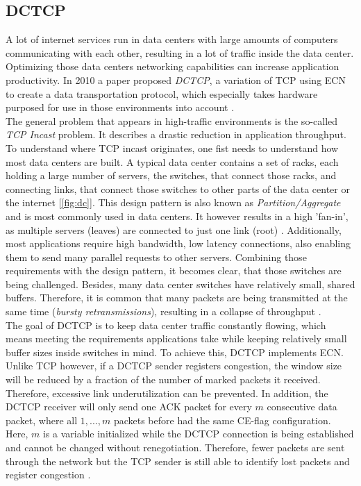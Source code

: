 \documentclass[a4paper,conference]{IEEEtran}
\begin{document}
\subsection{DCTCP}
\label{sec:DCTCP}
A lot of internet services run in data centers with large amounts of computers communicating with each other, resulting in a lot of traffic inside the data center. Optimizing those data centers networking capabilities can increase application productivity. In 2010 a paper proposed \textit{DCTCP}, a variation of TCP using ECN to create a data transportation protocol, which especially takes hardware purposed for use in those environments into account \cite{10.1145/1851275.1851192}.\\
The general problem that appears in high-traffic environments is the so-called \textit{TCP Incast} problem. It describes a drastic reduction in application throughput. To understand where TCP incast originates, one fist needs to understand how most data centers are built. A typical data center contains a set of racks, each holding a large number of servers, the switches, that connect those racks, and connecting links, that connect those switches to other parts of the data center or the internet [\autoref{fig:dc}]. This design pattern is also known as \textit{Partition/Aggregate} and is most commonly used in data centers. It however results in a high 'fan-in', as multiple servers (leaves) are connected to just one link (root) \cite{10.1145/1851275.1851192,10.1145/1592681.1592693}. Additionally, most applications require high bandwidth, low latency connections, also enabling them to send many parallel requests to other servers. Combining those requirements with the design pattern, it becomes clear, that those switches are being challenged. Besides, many data center switches have relatively small, shared buffers. Therefore, it is common that many packets are being transmitted at the same time (\textit{bursty retransmissions}), resulting in a collapse of throughput \cite{10.1145/1851275.1851192,10.1145/1592681.1592693}.\\
The goal of DCTCP is to keep data center traffic constantly flowing, which means meeting the requirements applications take while keeping relatively small buffer sizes inside switches in mind. To achieve this, DCTCP implements ECN. Unlike TCP however, if a DCTCP sender registers congestion, the window size will be reduced by a fraction of the number of marked packets it received. Therefore, excessive link underutilization can be prevented. In addition, the DCTCP receiver will only send one ACK packet for every $m$ consecutive data packet, where all $1,...,m$ packets before had the same CE-flag configuration. Here, $m$ is a variable initialized while the DCTCP connection is being established and cannot be changed without renegotiation. Therefore, fewer packets are sent through the network but the TCP sender is still able to identify lost packets and register congestion \cite{10.1145/1851275.1851192}.
\end{document}
